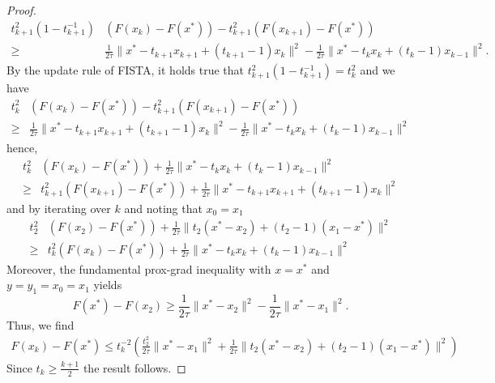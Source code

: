 \begin{proof}
    \begin{equation}
        \begin{aligned}
            t_{k+1}^2(1-t_{k+1}^{-1}) &(F(x_k)-F(x^*)) - t_{k+1}^2(F(x_{k+1})-F(x^*))\\
            \geq& \frac{1}{2\tau}\|x^* - t_{k+1} x_{k+1}+ (t_{k+1}-1)x_k\|^2 - \frac{1}{2\tau}\|x^* - t_k x_k + (t_k-1)x_{k-1}\|^2.
        \end{aligned}
    \end{equation}
    By the update rule of FISTA, it holds true that $t_{k+1}^2(1-t_{k+1}^{-1}) = t_{k}^2$ and we have
    \begin{equation}
        \begin{aligned}
            t_{k}^2 &(F(x_k)-F(x^*)) - t_{k+1}^2(F(x_{k+1})-F(x^*))\\
            \geq& \frac{1}{2\tau}\|x^* - t_{k+1} x_{k+1}+ (t_{k+1}-1)x_k\|^2 - \frac{1}{2\tau}\|x^* - t_k x_k + (t_k-1)x_{k-1}\|^2
        \end{aligned}
    \end{equation}
    hence,
    \begin{equation}
        \begin{aligned}
            t_{k}^2 &(F(x_k)-F(x^*)) + \frac{1}{2\tau}\|x^* - t_k x_k + (t_k-1)x_{k-1}\|^2\\
            \geq& t_{k+1}^2(F(x_{k+1})-F(x^*)) + \frac{1}{2\tau}\|x^* - t_{k+1} x_{k+1}+ (t_{k+1}-1)x_k\|^2
        \end{aligned}
    \end{equation}
    and by iterating over $k$ and noting that $x_0=x_1$
    \begin{equation}
        \begin{aligned}
            t_{2}^2 &(F(x_2)-F(x^*)) + \frac{1}{2\tau}\|t_2 (x^* - x_2) + (t_2-1)(x_{1}-x^*)\|^2\\
            \geq& t_{k}^2(F(x_{k})-F(x^*)) + \frac{1}{2\tau}\|x^* - t_{k} x_{k}+ (t_{k}-1)x_{k-1}\|^2
        \end{aligned}
    \end{equation}
    Moreover, the fundamental prox-grad inequality with $x=x^*$ and $y=y_1=x_0=x_1$ yields
    \begin{equation}
        F(x^*) - F(x_2)\geq \frac{1}{2\tau}\|x^* - x_2\|^2 - \frac{1}{2\tau}\|x^* - x_1\|^2.
    \end{equation}
    Thus, we find
    \begin{equation}
        \begin{aligned}
            F(x_{k})-F(x^*)
            \leq t_k^{-2}\left(\frac{t_2^2}{2\tau}\|x^* - x_1\|^2 + \frac{1}{2\tau}\|t_2 (x^* - x_2) + (t_2-1)(x_{1}-x^*)\|^2\right)
        \end{aligned}
    \end{equation}
    Since $t_k\geq \frac{k+1}{2}$ the result follows.
\end{proof}